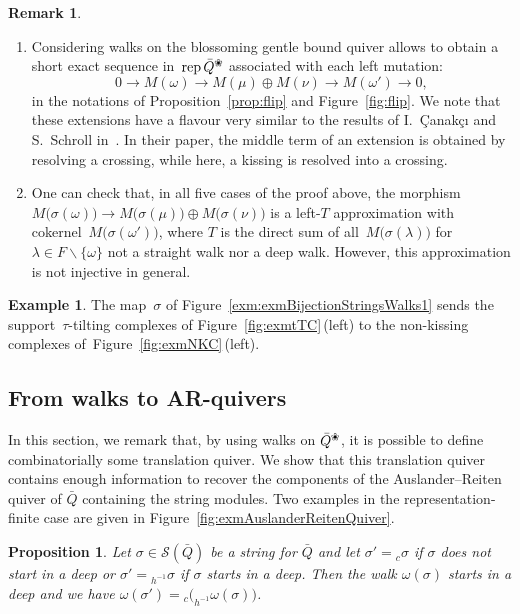 \documentclass{memo-l}
\newtheorem{proposition}[theorem]{Proposition}
\theoremstyle{definition}
\newtheorem{example}[theorem]{Example}
\newtheorem{remark}[theorem]{Remark}
\newcommand{\ssm}{\smallsetminus} %
\newcommand{\fref}[1]{Figure~\ref{#1}} %
\newcommand{\blossom}{^\text{\ding{96}}} %
\newcommand{\strings}{\mathcal{S}} %
\newcommand{\rep}{\operatorname{{\rm rep}}}
\begin{document}
\begin{remark}
\begin{enumerate}
\item Considering walks on the blossoming gentle bound quiver allows to obtain a short exact sequence in~$\rep \bar Q\blossom$ associated with each left mutation:
\[
0\rightarrow M(\omega) \rightarrow M(\mu) \oplus M(\nu) \rightarrow M(\omega') \rightarrow 0,
\]
in the notations of Proposition~\ref{prop:flip} and Figure~\ref{fig:flip}.
We note that these extensions have a flavour very similar to the results of I.~\c{C}anak\c{c}{\i} and S.~Schroll in~\cite{CanakciSchroll}.
In their paper, the middle term of an extension is obtained by resolving a crossing, while here, a kissing is resolved into a crossing.
\item One can check that, in all five cases of the proof above, the morphism $M \big( \sigma(\omega) \big) \rightarrow M \big( \sigma(\mu) \big) \oplus M \big( \sigma(\nu) \big)$ is a left-$T$ approximation with cokernel~$M \big( \sigma(\omega') \big)$, where $T$ is the direct sum of all~$M \big( \sigma(\lambda) \big)$ for $\lambda \in F \ssm \{\omega\}$ not a straight walk nor a deep walk.
 However, this approximation is not injective in general.
\end{enumerate}
\end{remark}


\begin{example}
The map~$\sigma$ of \fref{exm:exmBijectionStringsWalks1} sends the support~$\tau$-tilting complexes of \fref{fig:exmtTC}\,(left) to the non-kissing complexes of~\fref{fig:exmNKC}\,(left).
\end{example}

\subsection{From walks to AR-quivers}

In this section, we remark that, by using walks on $\bar Q\blossom$, it is possible to define combinatorially some translation quiver.
We show that this translation quiver contains enough information to recover the components of the Auslander--Reiten quiver of $\bar Q$ containing the string modules.
Two examples in the representation-finite case are given in Figure~\ref{fig:exmAuslanderReitenQuiver}.

\begin{proposition}\label{proposition: elementary moves and walks}
Let $\sigma\in\strings(\bar Q)$ be a string for $\bar Q$ and let $\sigma' = {}_c\sigma$ if $\sigma$ does not start in a deep or $\sigma' = {}_{h^{-1}}\sigma$ if $\sigma$ starts in a deep.
Then the walk $\omega(\sigma)$ starts in a deep and we have $\omega(\sigma') = {}_c\big(_{h^{-1}}\omega(\sigma)\big)$.
\end{proposition}
\end{document}
